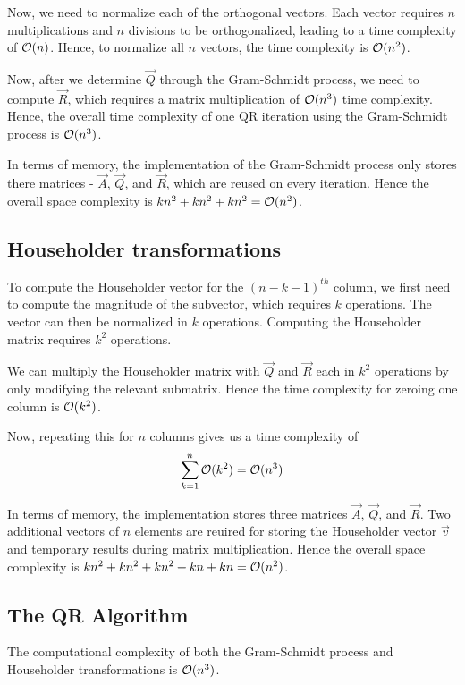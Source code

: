 \documentclass{article}
\begin{document}
Now, we need to normalize each of the orthogonal vectors. Each vector requires
$n$ multiplications and $n$ divisions to be orthogonalized, leading to a 
time complexity of $\mathcal{O}(n)$. Hence, to normalize all $n$ vectors, the time
complexity is $\mathcal{O}(n^2)$.

Now, after we determine $\vec{Q}$ through the Gram-Schmidt process, we need
to compute $\vec{R}$, which requires a matrix multiplication of $\mathcal{O}(n^3)$ time complexity.
Hence, the overall time complexity of one QR iteration using the Gram-Schmidt process
is $\mathcal{O}(n^3)$.

In terms of memory, the implementation of the Gram-Schmidt process only stores there
matrices - $\vec{A}$, $\vec{Q}$, and $\vec{R}$, which are reused on every iteration.
Hence the overall space complexity is $kn^2 + kn^2 + kn^2 = \mathcal{O}(n^2)$.

\subsection{Householder transformations}

To compute the Householder vector for the $(n - k - 1)^{th}$ column, we first need to
compute the magnitude of the subvector, which requires $k$ operations. The vector
can then be normalized in $k$ operations. Computing the Householder matrix requires
$k^2$ operations.

We can multiply the Householder matrix with $\vec{Q}$ and $\vec{R}$ each in $k^2$
operations by only modifying the relevant submatrix. Hence the time complexity for
zeroing one column is $\mathcal{O}(k^2)$.

Now, repeating this for $n$ columns gives us a time complexity of
\begin{align}
    \sum_{k=1}^n \mathcal{O}(k^2) = \mathcal{O}(n^3)
\end{align}

In terms of memory, the implementation stores three matrices $\vec{A}$, $\vec{Q}$, 
and $\vec{R}$. Two additional vectors of $n$ elements are reuired for storing the
Householder vector $\vec{v}$ and temporary results during matrix multiplication.
Hence the overall space complexity is $kn^2 + kn^2 + kn^2 + kn + kn = \mathcal{O}(n^2)$.

\subsection{The QR Algorithm}

The computational complexity of both the Gram-Schmidt process and Householder transformations
is $\mathcal{O}(n^3)$.
\end{document}
